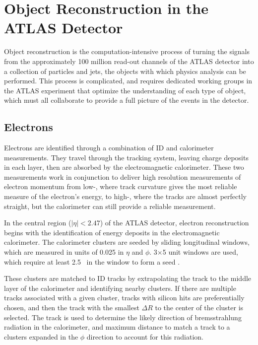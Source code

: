 \chapter{Object Reconstruction in the ATLAS Detector} %
\label{ch:reconstruction} 

Object reconstruction is the computation-intensive process of turning the signals from the approximately 100 million read-out channels of the ATLAS detector into a collection of particles and jets, the objects with which physics analysis can be performed. This process is complicated, and requires dedicated working groups in the ATLAS experiment that optimize the understanding of each type of object, which must all collaborate to provide a full picture of the events in the detector.


\section{Electrons}
\label{sec:reco_electrons}

Electrons are identified through a combination of \ac{ID} and calorimeter measurements. They travel through the tracking system, leaving charge deposits in each layer, then are absorbed by the electromagnetic calorimeter. These two measurements work in conjunction to deliver high resolution measurements of electron momentum from low-\pt, where track curvature gives the most reliable measure of the electron's energy, to high-\pt, where the tracks are almost perfectly straight, but the calorimeter can still provide a reliable measurement. 

In the central region ($|\eta|<2.47$) of the ATLAS detector, electron reconstruction begins with the identification of energy deposits in the electromagnetic calorimeter. The calorimeter clusters are seeded by sliding longitudinal windows, which are measured in units of 0.025 in $\eta$ and $\phi$. 3$\times$5 unit windows are used, which require at least 2.5 \gev~in the window to form a seed \cite{Aad:2011mk}. 

These clusters are matched to \ac{ID} tracks by extrapolating the track to the middle layer of the calorimeter and identifying nearby clusters. If there are multiple tracks associated with a given cluster, tracks with silicon hits are preferentially chosen, and then the track with the smallest $\Delta R$ to the center of the cluster is selected. The track is used to determine the likely direction of bremsstrahlung radiation in the calorimeter, and maximum distance to match a track to a clusters expanded in the $\phi$ direction to account for this radiation.

